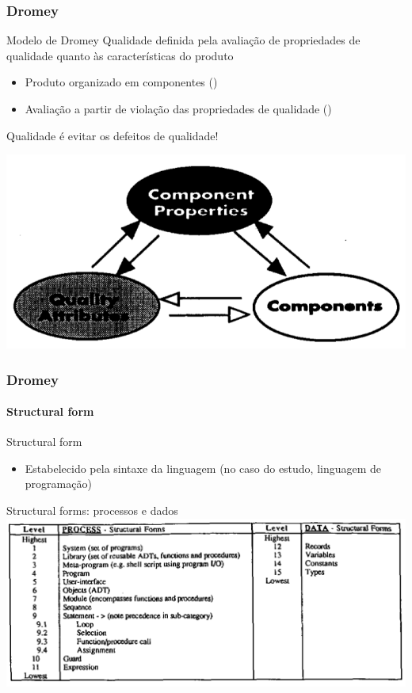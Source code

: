 \begin{frame}[parent={ie:agenda}, hasnext=true, hasprev=false]
	\frametitle{Dromey}

	\begin{block:concept}{Modelo de Dromey}
		Qualidade definida pela avaliação de propriedades de qualidade quanto às
		características do produto
		\begin{itemize}
			\item Produto organizado em componentes ()
			
			\item Avaliação a partir de violação das propriedades de qualidade
			()
		\end{itemize}
	
		Qualidade é evitar os defeitos de qualidade!
	\end{block:concept}
	
	\begin{block:fact}{}
		\centering
		\includegraphics[width=.6\textwidth]{software-engineering/project-management/product/dromey/dromey-generic_model}
	\end{block:fact}
\end{frame}



\begin{frame}[hasnext=true, hasprev=true]
	\frametitle{Dromey}
	\framesubtitle{Structural form}

	\begin{block:fact}{Structural form}
		\begin{itemize}
			\item Estabelecido pela sintaxe da linguagem (no caso do estudo, linguagem
			de programação)
		\end{itemize}
	\end{block:fact}
	
	\begin{block:fact}{Structural forms: processos e dados}
		\centering
		\includegraphics[width=\textwidth]{software-engineering/project-management/product/dromey/dromey-structural_forms}
	\end{block:fact}
\end{frame}



